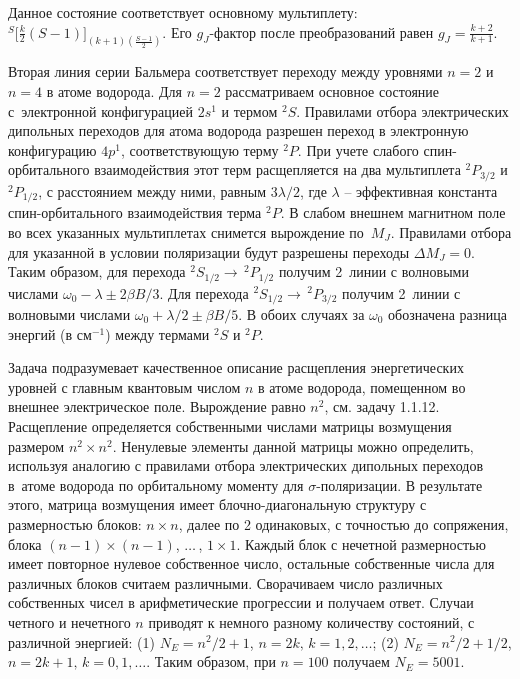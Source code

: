  Данное состояние соответствует основному мультиплету: $^S \Big[ \frac k2 (S-1) \Big]_{(k+1)(\frac{S-1}{2})}$. Его $g_J$-фактор после преобразований равен $g_{J} = \frac{k+2}{k+1}$.\par
{} Вторая линия серии Бальмера соответствует переходу между уровнями $n=2$ и $n=4$ в атоме водорода. Для $n=2$ рассматриваем основное состояние с~электронной конфигурацией $2s^1$ и термом $^2S$. Правилами отбора электрических дипольных переходов для атома водорода разрешен переход в электронную конфигурацию $4p^1$, соответствующую терму $^2P$. При учете слабого спин-орбитального взаимодействия этот терм расщепляется на два мультиплета $^2P_{3/2}$ и $^2P_{1/2}$, с расстоянием между ними, равным $3\lambda/2$, где $\lambda$ – эффективная константа спин-орбитального взаимодействия терма $^2P$. В слабом внешнем магнитном поле во всех указанных мультиплетах снимется вырождение по~$M_J$. Правилами отбора для указанной в условии поляризации будут разрешены переходы $\Delta M_J = 0$. Таким образом, для перехода $^2S_{1/2} \rightarrow\,^2P_{1/2}$ получим 2~линии с волновыми числами $\omega_{0}-\lambda \pm 2\beta
B/3$. Для перехода $^2S_{1/2} \rightarrow \,^2P_{3/2}$ получим 2~линии с волновыми числами $\omega_{0}+\lambda/2 \pm \beta B/5$. В обоих случаях за $\omega_{0}$ обозначена разница энергий (в см$^{-1}$) между термами $^2S$ и $^2P$.\par
{} Задача подразумевает качественное описание расщепления энергетических уровней с главным квантовым числом $n$ в атоме водорода, помещенном во внешнее электрическое поле. Вырождение равно $n^2$, см. задачу 1.1.12. Расщепление определяется собственными числами матрицы возмущения размером $n^2 \times n^2$. Ненулевые элементы данной матрицы можно определить, используя аналогию с правилами отбора электрических дипольных переходов в~атоме водорода по орбитальному моменту для $\sigma$-поляризации. В результате этого, матрица возмущения имеет блочно-диагональную структуру с размерностью блоков: $n \times n$, далее по 2 одинаковых, с точностью до сопряжения, блока $(n-1) \times (n-1)$, $\ldots\,$, $1 \times 1$. Каждый блок с нечетной размерностью имеет повторное нулевое собственное число, остальные собственные числа для различных блоков считаем различными. Сворачиваем число различных собственных чисел в арифметические прогрессии и получаем ответ. Случаи четного и нечетного $n$ приводят к немного разному количеству состояний, с различной энергией: (1) $N_E=n^2 / 2 + 1$, $n=2k,\,k=1\text{,}\,2\text{,}\,\ldots$; (2) $N_E=n^2 / 2 + 1/2$, $n=2k+1,\,k=0\text{,}\,1\text{,}\,\ldots$. Таким образом, при $n = \text{100}$ получаем $N_E=\text{5001}$. \par

